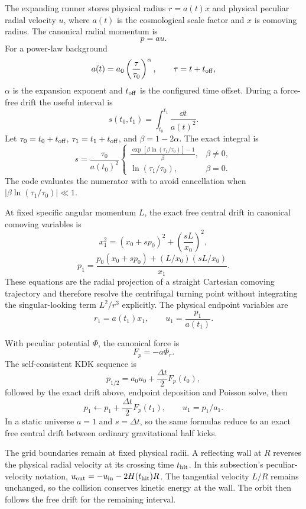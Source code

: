The expanding runner stores physical radius \(r=a(t)x\) and physical peculiar
radial velocity \(u\), where \(a(t)\) is the cosmological scale factor and
\(x\) is comoving radius.  The canonical radial momentum is
\[
 p=a u.
\]
For a power-law background
\[
 a(t)=a_0\left(\frac{\tau}{\tau_0}\right)^\alpha,
 \qquad \tau=t+t_{\rm off},
\]
\(\alpha\) is the expansion exponent and \(t_{\rm off}\) is the configured
time offset.  During a force-free drift the useful interval is
\[
 s(t_0,t_1)=\int_{t_0}^{t_1}\frac{\dd t}{a(t)^2}.
\]
Let \(\tau_0=t_0+t_{\rm off}\), \(\tau_1=t_1+t_{\rm off}\), and
\(\beta=1-2\alpha\).  The exact integral is
\[
 s=\frac{\tau_0}{a(t_0)^2}
 \begin{cases}
  \displaystyle
  \frac{\exp\!\left[\beta\ln(\tau_1/\tau_0)\right]-1}{\beta},
  &\beta\ne0,\\[8pt]
  \ln(\tau_1/\tau_0),&\beta=0.
 \end{cases}
\]
The code evaluates the numerator with  to avoid cancellation when
\(|\beta\ln(\tau_1/\tau_0)|\ll1\).

At fixed specific angular momentum \(L\), the exact free central drift in
canonical comoving variables is
\[
 x_1^2=(x_0+s p_0)^2+
       \left(\frac{sL}{x_0}\right)^2,
\]
\[
 p_1=\frac{p_0(x_0+s p_0)
 +(L/x_0)(sL/x_0)}{x_1}.
\]
These equations are the radial projection of a straight Cartesian comoving
trajectory and therefore resolve the centrifugal turning point without
integrating the singular-looking term \(L^2/r^3\) explicitly.  The physical
endpoint variables are
\[
 r_1=a(t_1)x_1,\qquad u_1=\frac{p_1}{a(t_1)}.
\]

With peculiar potential \(\Phi\), the canonical force is
\[
 F_p=-a\Phi_r.
\]
The self-consistent KDK sequence is
\[
 p_{1/2}=a_0u_0+\frac{\Delta t}{2}F_p(t_0),
\]
followed by the exact drift above, endpoint deposition and Poisson solve, then
\[
 p_1\leftarrow p_1+\frac{\Delta t}{2}F_p(t_1),
 \qquad u_1=p_1/a_1.
\]
In a static universe \(a=1\) and \(s=\Delta t\), so the same formulas reduce
to an exact free central drift between ordinary gravitational half kicks.

The grid boundaries remain at fixed physical radii. A reflecting wall at
\(R\) reverses the physical radial velocity at its crossing time
\(t_{\rm hit}\). In this subsection's peculiar-velocity notation,
\(u_{\rm out}=-u_{\rm in}-2H(t_{\rm hit})R\). The tangential velocity
\(L/R\) remains unchanged, so the collision conserves kinetic energy at
the wall. The orbit then follows the free drift for the remaining interval.

